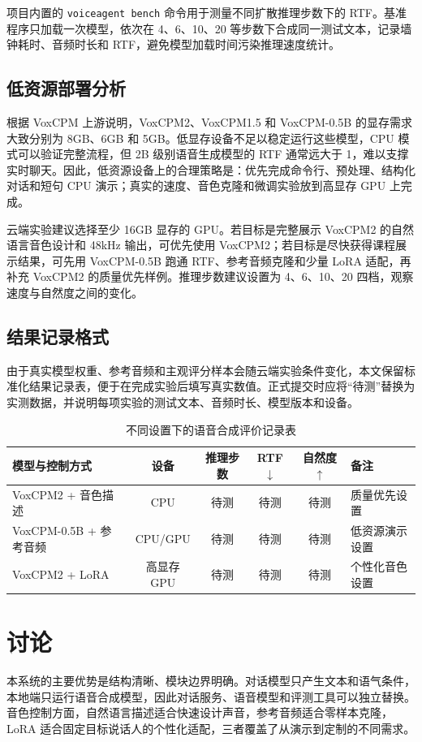 \documentclass[UTF8,a4paper,12pt]{ctexart}
\begin{document}
项目内置的 \texttt{voiceagent bench} 命令用于测量不同扩散推理步数下的 RTF。基准程序只加载一次模型，依次在 4、6、10、20 等步数下合成同一测试文本，记录墙钟耗时、音频时长和 RTF，避免模型加载时间污染推理速度统计。

\subsection{低资源部署分析}
根据 VoxCPM 上游说明，VoxCPM2、VoxCPM1.5 和 VoxCPM-0.5B 的显存需求大致分别为 8GB、6GB 和 5GB。低显存设备不足以稳定运行这些模型，CPU 模式可以验证完整流程，但 2B 级别语音生成模型的 RTF 通常远大于 1，难以支撑实时聊天。因此，低资源设备上的合理策略是：优先完成命令行、预处理、结构化对话和短句 CPU 演示；真实的速度、音色克隆和微调实验放到高显存 GPU 上完成。

云端实验建议选择至少 16GB 显存的 GPU。若目标是完整展示 VoxCPM2 的自然语言音色设计和 48kHz 输出，可优先使用 VoxCPM2；若目标是尽快获得课程展示结果，可先用 VoxCPM-0.5B 跑通 RTF、参考音频克隆和少量 LoRA 适配，再补充 VoxCPM2 的质量优先样例。推理步数建议设置为 4、6、10、20 四档，观察速度与自然度之间的变化。

\subsection{结果记录格式}
由于真实模型权重、参考音频和主观评分样本会随云端实验条件变化，本文保留标准化结果记录表，便于在完成实验后填写真实数值。正式提交时应将“待测”替换为实测数据，并说明每项实验的测试文本、音频时长、模型版本和设备。

\begin{table}[htbp]
  \centering
  \caption{不同设置下的语音合成评价记录表}
  \label{tab:result-template}
  \begin{tabularx}{\linewidth}{lccccX}
    \toprule
    模型与控制方式 & 设备 & 推理步数 & RTF $\downarrow$ & 自然度 $\uparrow$ & 备注 \\
    \midrule
    VoxCPM2 + 音色描述 & CPU & 待测 & 待测 & 待测 & 质量优先设置 \\
    VoxCPM-0.5B + 参考音频 & CPU/GPU & 待测 & 待测 & 待测 & 低资源演示设置 \\
    VoxCPM2 + LoRA & 高显存 GPU & 待测 & 待测 & 待测 & 个性化音色设置 \\
    \bottomrule
  \end{tabularx}
\end{table}

\section{讨论}
本系统的主要优势是结构清晰、模块边界明确。对话模型只产生文本和语气条件，本地端只运行语音合成模型，因此对话服务、语音模型和评测工具可以独立替换。音色控制方面，自然语言描述适合快速设计声音，参考音频适合零样本克隆，LoRA 适合固定目标说话人的个性化适配，三者覆盖了从演示到定制的不同需求。
\end{document}
